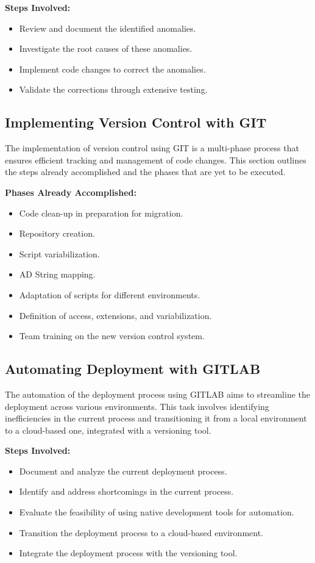 \textbf{Steps Involved:}
\begin{itemize}
    \item Review and document the identified anomalies.
    \item Investigate the root causes of these anomalies.
    \item Implement code changes to correct the anomalies.
    \item Validate the corrections through extensive testing.
\end{itemize}

\subsection{Implementing Version Control with GIT}

The implementation of version control using GIT is a multi-phase process that ensures efficient tracking and management of code changes. This section outlines the steps already accomplished and the phases that are yet to be executed.

\textbf{Phases Already Accomplished:}
\begin{itemize}
    \item Code clean-up in preparation for migration.
    \item Repository creation.
    \item Script variabilization.
    \item AD String mapping.
    \item Adaptation of scripts for different environments.
    \item Definition of access, extensions, and variabilization.
    \item Team training on the new version control system.
\end{itemize}

\subsection{Automating Deployment with GITLAB}

The automation of the deployment process using GITLAB aims to streamline the deployment across various environments. This task involves identifying inefficiencies in the current process and transitioning it from a local environment to a cloud-based one, integrated with a versioning tool.

\textbf{Steps Involved:}
\begin{itemize}
    \item Document and analyze the current deployment process.
    \item Identify and address shortcomings in the current process.
    \item Evaluate the feasibility of using native development tools for automation.
    \item Transition the deployment process to a cloud-based environment.
    \item Integrate the deployment process with the versioning tool.
\end{itemize}

